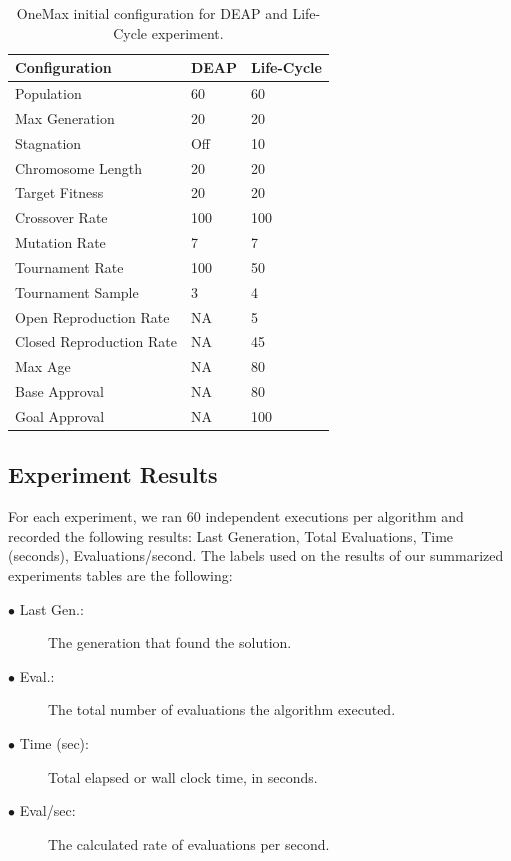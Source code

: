 \documentclass[runningheads]{llncs}
\begin{document}
\begin{table}[]
    \centering        
    \caption{OneMax initial configuration for DEAP and Life-Cycle experiment.}\label{tab1}
    \begin{tabular}{|l|l|l|}
    \hline
    \textbf{Configuration} & \textbf{DEAP} & \textbf{Life-Cycle} \\ \hline
    Population & 60 & 60 \\ \hline
    Max Generation & 20 & 20 \\ \hline
    Stagnation & Off & 10 \\ \hline
    Chromosome Length & 20 & 20 \\ \hline
    Target Fitness & 20 & 20 \\ \hline
    Crossover Rate & 100 & 100 \\ \hline
    Mutation Rate & 7 & 7 \\ \hline
    Tournament Rate & 100 & 50 \\ \hline
    Tournament Sample & 3 & 4 \\ \hline
    Open Reproduction Rate & NA & 5 \\ \hline
    Closed Reproduction Rate & NA & 45 \\ \hline
    Max Age & NA & 80 \\ \hline
    Base Approval & NA & 80 \\ \hline
    Goal Approval & NA & 100 \\ \hline
    \end{tabular}
    \end{table}


\subsection{Experiment Results}

For each experiment, we ran 60 independent executions per algorithm and
recorded the following results: Last Generation, Total Evaluations, Time
(seconds), Evaluations/second. The labels used on the results of our summarized
experiments tables are the following:

\begin{description}  %
    \item[$\bullet$ Last Gen.:] The generation that found the solution.
    \item[$\bullet$ Eval.:] The total number of evaluations the algorithm executed. 
    \item[$\bullet$ Time (sec):] Total elapsed or wall clock time, in seconds. 
    \item[$\bullet$ Eval/sec:] The calculated rate of evaluations per second.
\end{description}
\end{document}
